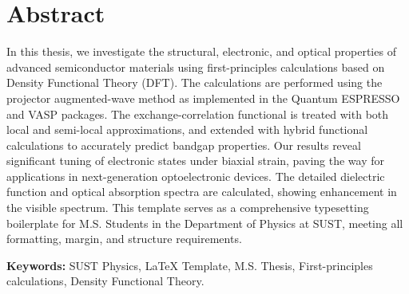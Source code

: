 
\chapter*{Abstract}


In this thesis, we investigate the structural, electronic, and optical properties of advanced semiconductor materials using first-principles calculations based on Density Functional Theory (DFT). The calculations are performed using the projector augmented-wave method as implemented in the Quantum ESPRESSO and VASP packages. The exchange-correlation functional is treated with both local and semi-local approximations, and extended with hybrid functional calculations to accurately predict bandgap properties. Our results reveal significant tuning of electronic states under biaxial strain, paving the way for applications in next-generation optoelectronic devices. The detailed dielectric function and optical absorption spectra are calculated, showing enhancement in the visible spectrum. This template serves as a comprehensive typesetting boilerplate for M.S. Students in the Department of Physics at SUST, meeting all formatting, margin, and structure requirements.

\vspace{0.25in}
\noindent
\textbf{Keywords:} SUST Physics, LaTeX Template, M.S. Thesis, First-principles calculations, Density Functional Theory.
